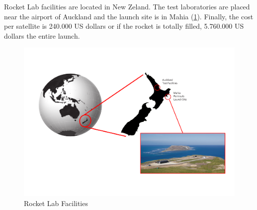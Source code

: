 Rocket Lab facilities are located in New Zeland. The test laboratories are placed near the airport of Auckland and the launch site is in Mahia (\ref{facilities}).
\newline
Finally, the cost per satellite is 240.000 US dollars or if the rocket is totally filled, 5.760.000 US dollars the entire launch. 
\begin{figure}[h!]
\includegraphics[scale=0.5]{./Sections_CD/S2-Launcher/Images_S2/Picture_4_S2.pdf} 
\caption{Rocket Lab Facilities}
\label{facilities}
\end{figure}
\newline


















%
